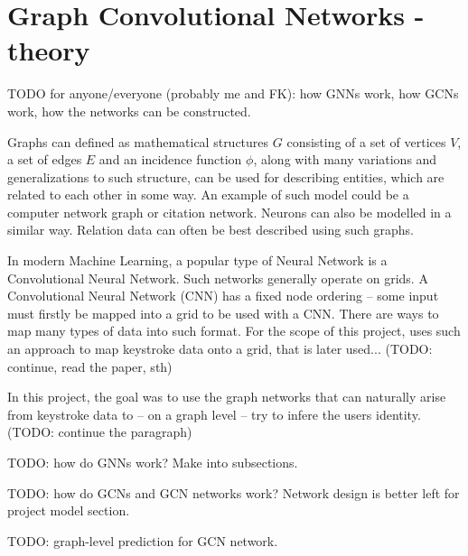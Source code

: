 
\chapter{Graph Convolutional Networks - theory}

TODO for anyone/everyone (probably me and FK): how GNNs work, how GCNs work, how the networks can be constructed.

Graphs can defined as mathematical structures $G$ consisting of a set of vertices $V$, a set of edges $E$ and an incidence function $\phi$, along with many variations and generalizations to such structure, can be used for describing entities, which are related to each other in some way. An example of such model could be a computer network graph or citation network. Neurons can also be modelled in a similar way. Relation data can often be best described using such graphs. \cite{Lesk2024}

In modern Machine Learning, a popular type of Neural Network is a Convolutional Neural Network. Such networks generally operate on grids. A Convolutional Neural Network (CNN) has a fixed node ordering -- some input must firstly be mapped into a grid to be used with a CNN. There are ways to map many types of data into such format. For the scope of this project, \cite{Shar2023} uses such an approach to map keystroke data onto a grid, that is later used... (TODO: continue, read the paper, sth)

In this project, the goal was to use the graph networks that can naturally arise from keystroke data to -- on a graph level -- try to infere the users identity. (TODO: continue the paragraph)

TODO: how do GNNs work? Make into subsections.

TODO: how do GCNs and GCN networks work? Network design is better left for project model section.

TODO: graph-level prediction for GCN network.
